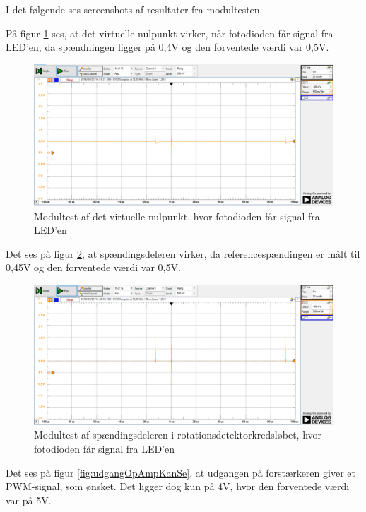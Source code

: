 I det følgende ses screenshots af resultater fra modultesten. 

På figur \ref{fig:virt0KanSe} ses, at det virtuelle nulpunkt virker, når fotodioden får signal fra LED'en, da spændningen ligger på 0,4V og den forventede værdi var 0,5V. 

\begin{figure}[H]
	\centering
	\includegraphics[width=\textwidth]{Test/images/AffyringTest/KanSe/virtuelt_nul}
	\caption{Modultest af det virtuelle nulpunkt, hvor fotodioden får signal fra LED'en}
	\label{fig:virt0KanSe}
\end{figure}

Det ses på figur \ref{fig:spaendingsdelerKanSe}, at spændingsdeleren virker, da referencespændingen er målt til 0,45V og den forventede værdi var 0,5V. 

\begin{figure}[H]
	\centering
	\includegraphics[width=\textwidth]{Test/images/AffyringTest/KanSe/spaendingsdeler}
	\caption{Modultest af spændingsdeleren i rotationsdetektorkredsløbet, hvor fotodioden får signal fra LED'en}
	\label{fig:spaendingsdelerKanSe}
\end{figure}

Det ses på figur \ref{fig:udgangOpAmpKanSe}, at udgangen på forstærkeren giver et PWM-signal, som ønsket. Det ligger dog kun på 4V, hvor den forventede værdi var på 5V. 


